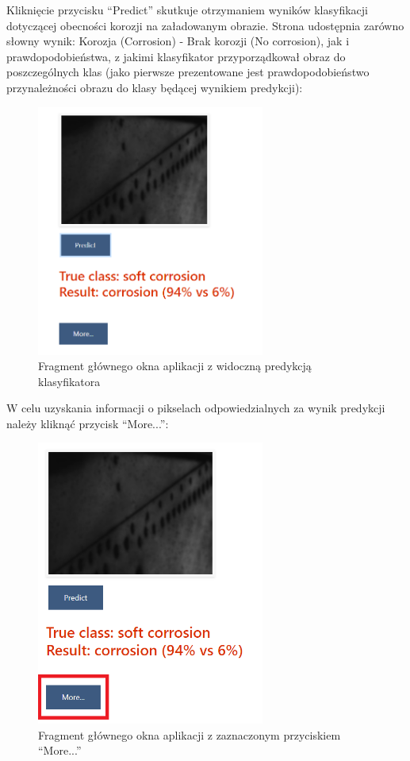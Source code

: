 \documentclass[polish,12pt]{aghthesis}
\begin{document}
\noindent Kliknięcie przycisku ``Predict'' skutkuje otrzymaniem wyników klasyfikacji dotyczącej obecności korozji na załadowanym obrazie. Strona udostępnia zarówno słowny wynik: Korozja (Corrosion) - Brak korozji (No corrosion), jak i prawdopodobieństwa, z jakimi klasyfikator przyporządkował obraz do poszczególnych klas (jako pierwsze prezentowane jest prawdopodobieństwo przynależności obrazu do klasy będącej wynikiem predykcji):
\begin{figure}[H]%
\centering
\includegraphics[width=7.5cm]{images/wynikiPredykcji.PNG}
\caption{Fragment głównego okna aplikacji z widoczną predykcją klasyfikatora}
\end{figure}

\noindent W celu uzyskania informacji o pikselach odpowiedzialnych za wynik predykcji należy kliknąć przycisk ``More...'':
\begin{figure}[H]%
\centering
\includegraphics[width=7.5cm]{images/more.PNG}
\caption{Fragment głównego okna aplikacji z zaznaczonym przyciskiem ``More...''}
\end{figure}
\end{document}
